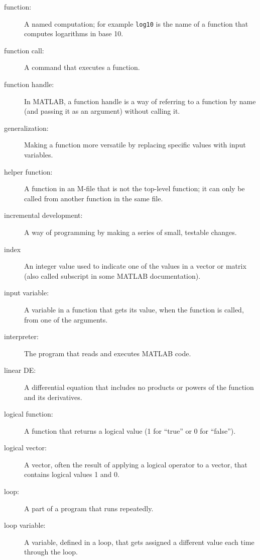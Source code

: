 \begin{description}
\item[function:] A named computation; for example {\tt log10} is the
name of a function that computes logarithms in base 10.

\item[function call:] A command that executes a function.

\item[function handle:] In MATLAB, a function handle is a way of
referring to a function by name (and passing it as an argument)
without calling it.

\item[generalization:] Making a function more versatile by replacing
specific values with input variables.

\item[helper function:] A function in an M-file that is not
the top-level function; it can only be called from another function
in the same file.

\item[incremental development:] A way of programming by making a series
of small, testable changes.

\item[index] An integer value used to indicate one of the values
in a vector or matrix (also called subscript in some MATLAB documentation).

\item[input variable:] A variable in a function that gets its value,
when the function is called, from one of the arguments.

\item[interpreter:] The program that reads and executes MATLAB code.

\item[linear DE:] A differential equation that includes no products or powers of the
function and its derivatives.

\item[logical function:] A function that returns a logical value
(1 for ``true'' or 0 for ``false'').

\item[logical vector:] A vector, often the result of applying a logical operator to a vector, that contains logical values 1 and 0.

\item[loop:] A part of a program that runs repeatedly.

\item[loop variable:] A variable, defined in a loop,
that gets assigned a different value each time through the loop.


\end{description}
